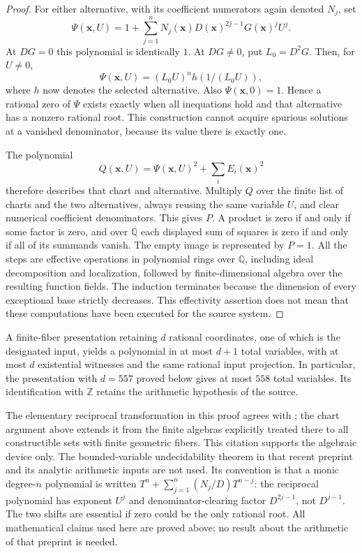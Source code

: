\begin{proof}
For either alternative, with its coefficient numerators again denoted
$N_j$, set
\[
 \Psi(\mathbf x,U)=1+\sum_{j=1}^n
 N_j(\mathbf x)D(\mathbf x)^{2j-1}G(\mathbf x)^jU^j.
\]
At $DG=0$ this polynomial is identically $1$. At $DG\ne0$, put
$L_0=D^2G$. Then, for $U\ne0$,
\[
 \Psi(\mathbf x,U)=(L_0U)^n h(1/(L_0U)),
\]
where $h$ now denotes the selected alternative. Also
$\Psi(\mathbf x,0)=1$. Hence a rational zero of $\Psi$ exists exactly
when all inequations hold and that alternative has a nonzero rational
root. This construction cannot acquire spurious solutions at a vanished
denominator, because its value there is exactly one.

The polynomial
\[
 Q(\mathbf x,U)=\Psi(\mathbf x,U)^2+\sum_iE_i(\mathbf x)^2
\]
therefore describes that chart and alternative. Multiply $Q$ over the
finite list of charts and the two alternatives, always reusing the same
variable $U$, and clear numerical coefficient denominators. This gives
$P$. A product is zero if and only if some factor is zero, and over
$\mathbb Q$ each displayed sum of squares is zero if and only if all of
its summands vanish. The empty image is represented by $P=1$.
All the steps are effective operations in polynomial rings over
$\mathbb Q$, including ideal decomposition and localization, followed by
finite-dimensional algebra over the resulting function fields. The
induction terminates because the dimension of every exceptional base
strictly decreases. This effectivity assertion does not mean that these
computations have been executed for the source system.
\end{proof}

\begin{corollary}
A finite-fiber presentation retaining $d$ rational coordinates, one of
which is the designated input, yields a polynomial in at most $d+1$
total variables, with at most $d$ existential witnesses and the same
rational input projection. In particular, the presentation with $d=557$
proved below gives at most $558$ total variables. Its identification
with $\mathbb Z$ retains the arithmetic hypothesis of the source.
\end{corollary}

The elementary reciprocal transformation in this proof agrees with
\cite[Section 10.6, equation (10.8)]{Sun2026Rational86}; the chart argument
above extends it from the finite algebras explicitly treated there to all
constructible sets with finite geometric fibers. This citation supports
the algebraic device only. The bounded-variable undecidability theorem
in that recent preprint and its analytic arithmetic inputs are not used.
Its convention is that a monic degree-$n$ polynomial is written
$T^n+\sum_{j=1}^n(N_j/D)T^{n-j}$: the reciprocal polynomial has exponent
$U^j$ and denominator-clearing factor $D^{2j-1}$, not $D^{j-1}$.
The two shifts are essential if zero could be the only rational root.
All mathematical claims used here are proved above; no result about
the arithmetic of that preprint is needed.
